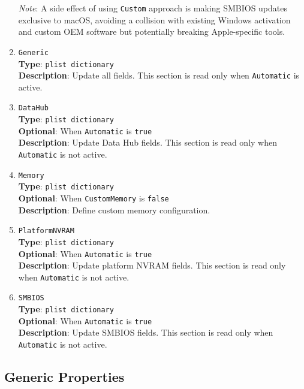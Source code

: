 \documentclass[]{article}
\begin{document}
\begin{enumerate}
  \emph{Note}: A side effect of using \texttt{Custom} approach is making
  SMBIOS updates exclusive to macOS, avoiding a collision with existing
  Windows activation and custom OEM software but potentially breaking
  Apple-specific tools.
\item
  \texttt{Generic}\\
  \textbf{Type}: \texttt{plist\ dictionary}\\
  \textbf{Description}: Update all fields. This section is read only
  when \texttt{Automatic} is active.
\item
  \texttt{DataHub}\\
  \textbf{Type}: \texttt{plist\ dictionary}\\
  \textbf{Optional}: When \texttt{Automatic} is \texttt{true}\\
  \textbf{Description}: Update Data Hub fields. This section is read
  only when \texttt{Automatic} is not active.
\item
  \texttt{Memory}\\
  \textbf{Type}: \texttt{plist\ dictionary}\\
  \textbf{Optional}: When \texttt{CustomMemory} is \texttt{false}\\
  \textbf{Description}: Define custom memory configuration.
\item
  \texttt{PlatformNVRAM}\\
  \textbf{Type}: \texttt{plist\ dictionary}\\
  \textbf{Optional}: When \texttt{Automatic} is \texttt{true}\\
  \textbf{Description}: Update platform NVRAM fields. This section is
  read only when \texttt{Automatic} is not active.
\item
  \texttt{SMBIOS}\\
  \textbf{Type}: \texttt{plist\ dictionary}\\
  \textbf{Optional}: When \texttt{Automatic} is \texttt{true}\\
  \textbf{Description}: Update SMBIOS fields. This section is read only
  when \texttt{Automatic} is not active.
\end{enumerate}

\subsection{Generic Properties}\label{platforminfogeneric}
\end{document}
